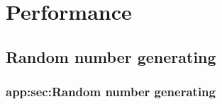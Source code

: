 \chapter{Performance}
\label{app:chap:Performance}

\section{Random number generating}
\subsection{app:sec:Random number generating}
